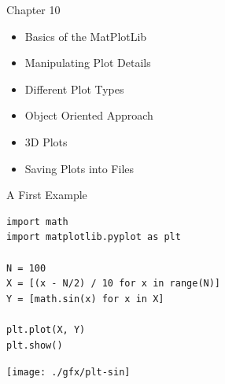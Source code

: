 


\begin{frame}[fragile]{Chapter 10}
%
\begin{itemize}
\item Basics of the MatPlotLib
\item Manipulating Plot Details
\item Different Plot Types
\item Object Oriented Approach
\item 3D Plots
\item Saving Plots into Files
\end{itemize}
%
\end{frame}


\begin{frame}[fragile]{A First Example}
%
\begin{codebox}[Example: A Simple Plot, width=.53\linewidth, nobeforeafter, equal height group = grpXmpSimplePlot]
\begin{verbatim}
import math
import matplotlib.pyplot as plt

N = 100
X = [(x - N/2) / 10 for x in range(N)]
Y = [math.sin(x) for x in X]

plt.plot(X, Y)
plt.show()
\end{verbatim}
\end{codebox}
%
\begin{tcolorbox}[title=Output: A Simple Plot, width=.45\linewidth, nobeforeafter, equal height group = grpXmpSimplePlot]
	\texttt{[image: ./gfx/plt-sin]}
\end{tcolorbox}
%
\end{frame}


